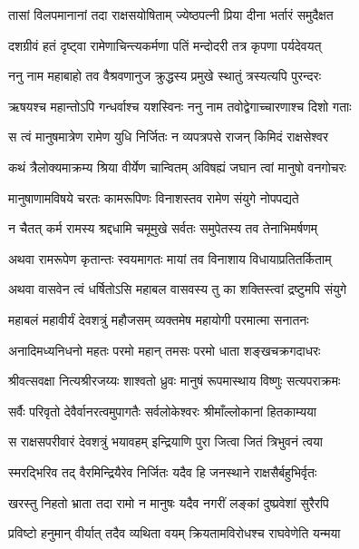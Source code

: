 
\twolineshloka
{तासां विलपमानानां तदा राक्षसयोषिताम्}
{ज्येष्ठपत्नी प्रिया दीना भर्तारं समुदैक्षत} %

\twolineshloka
{दशग्रीवं हतं दृष्ट्वा रामेणाचिन्त्यकर्मणा}
{पतिं मन्दोदरी तत्र कृपणा पर्यदेवयत्} %

\twolineshloka
{ननु नाम महाबाहो तव वैश्रवणानुज}
{क्रुद्धस्य प्रमुखे स्थातुं त्रस्यत्यपि पुरन्दरः} %

\twolineshloka
{ऋषयश्च महान्तोऽपि गन्धर्वाश्च यशस्विनः}
{ननु नाम तवोद्वेगाच्चारणाश्च दिशो गताः} %

\twolineshloka
{स त्वं मानुषमात्रेण रामेण युधि निर्जितः}
{न व्यपत्रपसे राजन् किमिदं राक्षसेश्वर} %

\twolineshloka
{कथं त्रैलोक्यमाक्रम्य श्रिया वीर्येण चान्वितम्}
{अविषह्यं जघान त्वां मानुषो वनगोचरः} %

\twolineshloka
{मानुषाणामविषये चरतः कामरूपिणः}
{विनाशस्तव रामेण संयुगे नोपपद्यते} %

\twolineshloka
{न चैतत् कर्म रामस्य श्रद्दधामि चमूमुखे}
{सर्वतः समुपेतस्य तव तेनाभिमर्षणम्} %

\twolineshloka
{अथवा रामरूपेण कृतान्तः स्वयमागतः}
{मायां तव विनाशाय विधायाप्रतितर्किताम्} %

\twolineshloka
{अथवा वासवेन त्वं धर्षितोऽसि महाबल}
{वासवस्य तु का शक्तिस्त्वां द्रष्टुमपि संयुगे} %

\twolineshloka
{महाबलं महावीर्यं देवशत्रुं महौजसम्}
{व्यक्तमेष महायोगी परमात्मा सनातनः} %

\twolineshloka
{अनादिमध्यनिधनो महतः परमो महान्}
{तमसः परमो धाता शङ्खचक्रगदाधरः} %

\twolineshloka
{श्रीवत्सवक्षा नित्यश्रीरजय्यः शाश्वतो ध्रुवः}
{मानुषं रूपमास्थाय विष्णुः सत्यपराक्रमः} %

\twolineshloka
{सर्वैः परिवृतो देवैर्वानरत्वमुपागतैः}
{सर्वलोकेश्वरः श्रीमाँल्लोकानां हितकाम्यया} %

\twolineshloka
{स राक्षसपरीवारं देवशत्रुं भयावहम्}
{इन्द्रियाणि पुरा जित्वा जितं त्रिभुवनं त्वया} %

\twolineshloka
{स्मरद्भिरिव तद् वैरमिन्द्रियैरेव निर्जितः}
{यदैव हि जनस्थाने राक्षसैर्बहुभिर्वृतः} %

\twolineshloka
{खरस्तु निहतो भ्राता तदा रामो न मानुषः}
{यदैव नगरीं लङ्कां दुष्प्रवेशां सुरैरपि} %

\twolineshloka
{प्रविष्टो हनुमान् वीर्यात् तदैव व्यथिता वयम्}
{क्रियतामविरोधश्च राघवेणेति यन्मया} %

